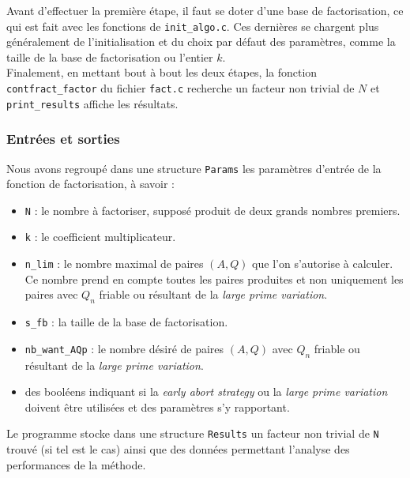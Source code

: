 Avant d'effectuer la première étape, il faut se doter d'une base de
factorisation, ce qui est fait avec les fonctions de \texttt{init\_algo.c}.
Ces dernières se chargent plus généralement de l'initialisation et du choix par
défaut des paramètres, comme la taille de la base de factorisation ou l'entier
$k$. \\

Finalement, en mettant bout à bout les deux étapes, la fonction 
\texttt{contfract\_factor} du fichier \texttt{fact.c} recherche un facteur
non trivial de $N$ et \texttt{print\_results} affiche les résultats. 

\subsubsection{Entrées et sorties}

Nous avons regroupé dans une structure \texttt{Params} les paramètres d'entrée 
de la fonction de factorisation, à savoir :

\begin{itemize}
    \item \texttt{N} : le nombre à factoriser, supposé produit de deux grands
                       nombres premiers.
    \item \texttt{k} : le coefficient multiplicateur.
    \item \texttt{n\_lim} : le nombre maximal de paires $(A,Q)$ que l'on 
                             s'autorise à calculer. Ce nombre prend en compte
                             toutes les paires produites et non uniquement les
                             paires avec $Q_n$ friable ou résultant de la  
                             \textit{large prime variation}.
    \item \texttt{s\_fb} : la taille de la base de factorisation. 
    \item \texttt{nb\_want\_AQp} : le nombre désiré de paires $(A,Q)$ avec $Q_n$ 
                                    friable ou résultant de la \textit{large prime 
                                   variation}.
                               \item des booléens indiquant si la \textit{early 
                                   abort strategy} ou la \textit{large prime variation}
                                   doivent être utilisées et des paramètres s'y rapportant.

\end{itemize}

Le programme stocke dans une structure \texttt{Results} un facteur non trivial
de \texttt{N} trouvé (si tel est le cas) ainsi que des données permettant 
l'analyse des performances de la méthode.  

